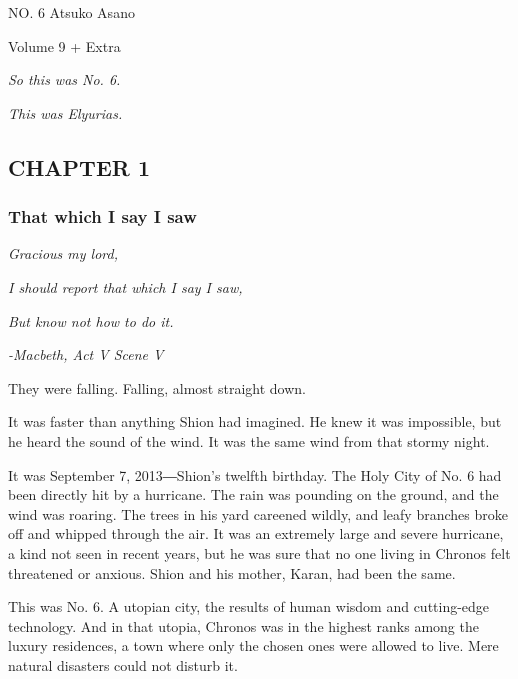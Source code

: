 \protect\hypertarget{titlepage.xhtml}{}{}

\protect\hypertarget{index_split_000.html}{}{}

NO. 6 \textbar{} Atsuko Asano

Volume 9 + Extra

\emph{So this was No. 6.}

\emph{This was Elyurias.}

\hypertarget{index_split_000.htmlux5cux23calibre_pb_0}{}

\protect\hypertarget{index_split_001.html}{}{}

\hypertarget{index_split_001.htmlux5cux23calibre_pb_0}{}

\hypertarget{index_split_001.htmlux5cux23calibre_toc_2}{%
\subsection{CHAPTER 1}\label{index_split_001.htmlux5cux23calibre_toc_2}}

\subsubsection{That which I say I saw}

\emph{Gracious my lord,}

\emph{I should report that which I say I saw,}

\emph{But know not how to do it.}

\emph{-Macbeth, Act V Scene V}

They were falling. Falling, almost straight down.

It was faster than anything Shion had imagined. He knew it was
impossible, but he heard the sound of the wind. It was the same wind
from that stormy night.

It was September 7, 2013―Shion's twelfth birthday. The Holy City of No.
6 had been directly hit by a hurricane. The rain was pounding on the
ground, and the wind was roaring. The trees in his yard careened wildly,
and leafy branches broke off and whipped through the air. It was an
extremely large and severe hurricane, a kind not seen in recent years,
but he was sure that no one living in Chronos felt threatened or
anxious. Shion and his mother, Karan, had been the same.

This was No. 6. A utopian city, the results of human wisdom and
cutting-edge technology. And in that utopia, Chronos was in the highest
ranks among the luxury residences, a town where only the chosen ones
were allowed to live. Mere natural disasters could not disturb it.

